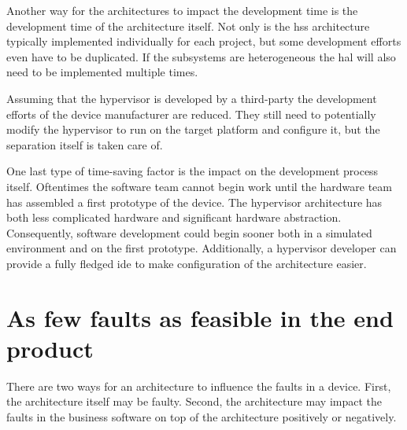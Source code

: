Another way for the architectures to impact the development time is the development time of the architecture itself. Not only is the \acrshort{hss} architecture typically implemented individually for each project, but some development efforts even have to be duplicated. If the subsystems are heterogeneous the \acrfull{hal} will also need to be implemented multiple times. 

Assuming that the hypervisor is developed by a third-party the development efforts of the device manufacturer are reduced. They still need to potentially modify the hypervisor to run on the target platform and configure it, but the separation itself is taken care of.

One last type of time-saving factor is the impact on the development process itself. Oftentimes the software team cannot begin work until the hardware team has assembled a first prototype of the device. The hypervisor architecture has both less complicated hardware and significant hardware abstraction. Consequently, software development could begin sooner both in a simulated environment and on the first prototype. Additionally, a hypervisor developer can provide a fully fledged \acrshort{ide} to make configuration of the architecture easier.


\section{As few faults as feasible in the end product}
There are two ways for an architecture to influence the faults in a device. First, the architecture itself may be faulty. Second, the architecture may impact the faults in the business software on top of the architecture positively or negatively.


